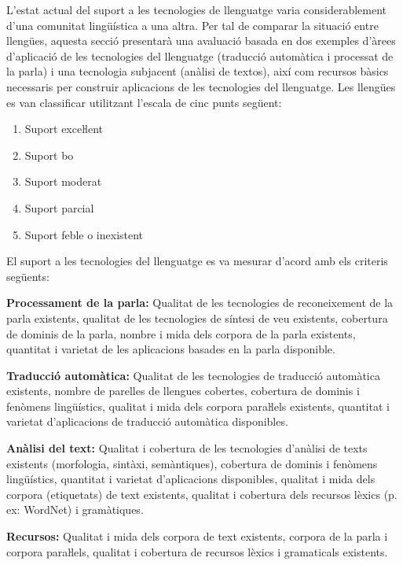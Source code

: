 \begin{multicols}{2}
L'estat actual del suport a les tecnologies de llenguatge varia considerablement d'una comunitat lingüística a una altra. Per tal de comparar la situació entre llengües, aquesta secció presentarà una avaluació basada en dos exemples d'àrees d'aplicació de les tecnologies del llenguatge (traducció automàtica i processat de la parla) i una tecnologia subjacent (anàlisi de textos), així com recursos bàsics necessaris per construir aplicacions de les tecnologies del llenguatge.
Les llengües es van classificar utilitzant l'escala de cinc punts següent:

\begin{enumerate}
\item Suport exceŀlent
\item Suport bo
\item Suport moderat
\item Suport parcial
\item Suport feble o inexistent
\end{enumerate}

El suport a les tecnologies del llenguatge es va mesurar d'acord amb els criteris següents:

\textbf{Processament de la parla:} Qualitat de les tecnologies de reconeixement de la parla existents, qualitat de les tecnologies de síntesi de veu  existents, cobertura de dominis de la parla, nombre i mida dels corpora de la parla existents, quantitat i varietat de les aplicacions basades en la parla disponible.

\textbf{Traducció automàtica:} Qualitat de les tecnologies de traducció automàtica existents, nombre de parelles de llengues cobertes, cobertura de dominis i fenòmens lingüístics, qualitat i mida dels corpora paraŀlels existents, quantitat i varietat d'aplicacions de traducció automàtica disponibles.

\textbf{Anàlisi del text:} Qualitat i cobertura de les tecnologies d'anàlisi de texts existents (morfologia, sintàxi, semàntiques), cobertura de dominis i fenòmens lingüístics, quantitat i varietat d'aplicacions disponibles, qualitat i mida dels corpora (etiquetats) de text existents, qualitat i cobertura dels recursos lèxics (p. ex: WordNet) i gramàtiques.

\textbf{Recursos:} Qualitat i mida dels corpora de text existents, corpora de la parla i corpora paraŀlels, qualitat i cobertura de recursos lèxics i gramaticals existents.


\end{multicols}
